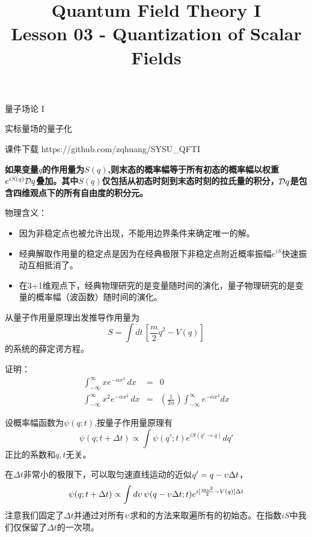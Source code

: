 \documentclass[CJK]{beamer}
\title{Quantum Field Theory I \\ Lesson 03 - Quantization of Scalar Fields}
\author{}
\date{}
\begin{document}
\begin{frame}
 
\begin{center}
\begin{Large}
\bch
量子场论 I 

{\vskip 0.3in}

实标量场的量子化

\ech
\end{Large}
\end{center}

\vskip 0.2in

\bch
课件下载
\ech
https://github.com/zqhuang/SYSU\_QFTI

\end{frame}



\begin{frame}
\bch
{\bf 如果变量$q$的作用量为$S(q)$,则末态的概率幅等于所有初态的概率幅以权重$e^{iS(q)}\mathcal{D} q$叠加。其中$S(q)$仅包括从初态时刻到末态时刻的拉氏量的积分，$\mathcal{D} q$是包含四维观点下的所有自由度的积分元。}

\skipline
物理含义：
\begin{itemize}
\item{因为非稳定点也被允许出现，不能用边界条件来确定唯一的解。}
\item{经典解取作用量的稳定点是因为在经典极限下非稳定点附近概率振幅$e^{iS}$快速振动互相抵消了。}
\item{在3+1维观点下，经典物理研究的是变量随时间的演化，量子物理研究的是变量的概率幅（波函数）随时间的演化。}
\end{itemize}
\ech
\end{frame}


\begin{frame}
\bch
从量子作用量原理出发推导作用量为
$$S = \int dt\,  \left[\frac{m}{2}\dot q^2 - V(q)\right]$$
的系统的薛定谔方程。
\ech
\end{frame}

\begin{frame}
\bch
证明：
\begin{eqnarray}
\int_{-\infty}^{\infty} x e^{-\alpha x^2 }\, dx &=& 0 \\
\int_{-\infty}^{\infty} x^2 e^{-\alpha x^2 }\, dx &=& \left(\frac{1}{2\alpha}\right) \int_{-\infty}^{\infty} e^{-\alpha x^2} dx 
\end{eqnarray}
\ech
\end{frame}

\begin{frame}
\bch
设概率幅函数为$\psi(q;t)$,按量子作用量原理有 
$$ \psi(q; t+\Delta t) \propto \int \psi(q';t) e^{iS(q'\rightarrow q)}dq'$$
正比的系数和$q,t$无关。
\skipline

在$\Delta t$非常小的极限下，可以取匀速直线运动的近似$q' = q - \upsilon \Delta t$，
$$ \psi(q; t+\Delta t) \propto \int d\upsilon\, \psi(q-\upsilon \Delta t; t) e^{i[\frac{m\upsilon^2}{2} - V(q)]\Delta t}$$
注意我们固定了$\Delta t$并通过对所有$\upsilon$求和的方法来取遍所有的初始态。在指数$iS$中我们仅保留了$\Delta t$的一次项。
\ech
\end{frame}
\end{document}
